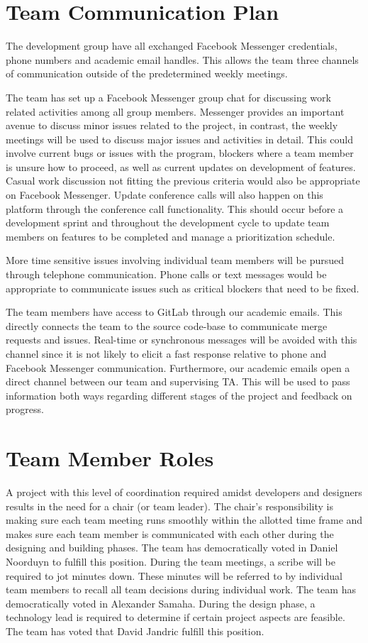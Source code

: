 \documentclass{article}
\begin{document}
\section{Team Communication Plan}

The development group have all exchanged Facebook Messenger credentials, phone
numbers and academic email handles. This allows the team three channels of
communication outside of the predetermined weekly meetings.

The team has set up a Facebook Messenger group chat for discussing work related
activities among all group members. Messenger provides an important avenue to
discuss minor issues related to the project, in contrast, the weekly meetings
will be used to discuss major issues and activities in detail. This could
involve current bugs or issues with the program, blockers where a team member is
unsure how to proceed, as well as current updates on development of features.
Casual work discussion not fitting the previous criteria would also be
appropriate on Facebook Messenger. Update conference calls will also happen on
this platform through the conference call functionality. This should occur
before a development sprint and throughout the development cycle to update team
members on features to be completed and manage a prioritization schedule.

More time sensitive issues involving individual team members will be pursued
through telephone communication. Phone calls or text messages would be
appropriate to communicate issues such as critical blockers that need to be
fixed.

The team members have access to GitLab through our academic emails. This
directly connects the team to the source code-base to communicate merge requests
and issues. Real-time or synchronous messages will be avoided with this channel
since it is not likely to elicit a fast response relative to phone and Facebook
Messenger communication. Furthermore, our academic emails open a direct channel
between our team and supervising TA. This will be used to pass information both
ways regarding different stages of the project and feedback on progress.

\section{Team Member Roles}

A project with this level of coordination required amidst developers and
designers results in the need for a chair (or team leader). The chair's
responsibility is making sure each team meeting runs smoothly within the
allotted time frame and makes sure each team member is communicated with each
other during the designing and building phases. The team has democratically
voted in Daniel Noorduyn to fulfill this position.  During the team meetings, a
scribe will be required to jot minutes down. These minutes will be referred to
by individual team members to recall all team decisions during individual work.
The team has democratically voted in Alexander Samaha. During the design phase,
a technology lead is required to determine if certain project aspects are
feasible. The team has voted that David Jandric fulfill this position.
\end{document}
